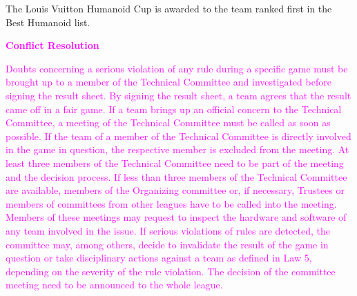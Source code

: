\bigskip

The Louis Vuitton Humanoid Cup is awarded to the team ranked first in the Best Humanoid list.

\bigskip

\textcolor{magenta}{{\bfseries Conflict Resolution}}

\headlinebox

\textcolor{magenta}{
Doubts concerning a serious violation of any rule during a specific game must be brought up to a member of the Technical Committee and investigated before signing the result sheet. By signing the result sheet, a team agrees that the result came off in a fair game. If a team brings up an official concern to the Technical Committee, a meeting of the Technical Committee must be called as soon as possible. If the team of a member of the Technical Committee is directly involved in the game in question, the respective member is excluded from the meeting. At least three members of the Technical Committee need to be part of the meeting and the decision process. If less than three members of the Technical Committee are available, members of the Organizing committee or, if necessary, Trustees or members of committees from other leagues have to be called into the meeting. Members of these meetings may request to inspect the hardware and software of any team involved in the issue. If serious violations of rules are detected, the committee may, among others, decide to invalidate the result of the game in question or take disciplinary actions against a team as defined in Law 5, depending on the severity of the rule violation. The decision of the committee meeting need to be announced to the whole league.}
